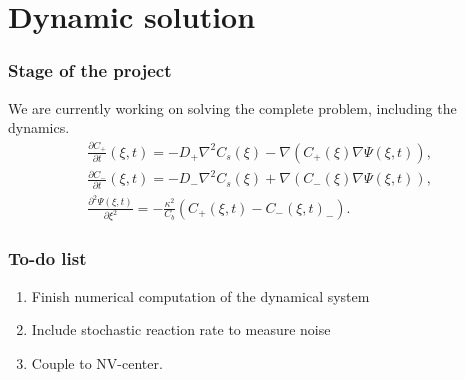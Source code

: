 \documentclass{beamer}
\begin{document}
\section{Dynamic solution}
\begin{frame}
\frametitle{Stage of the project}
We are currently working on solving the complete problem, including the dynamics. 
\begin{align}
\frac{\partial C_+}{\partial t}(\xi,t)  = - D_+ \nabla^2 C_s(\xi) - \nabla(C_+(\xi) \nabla \Psi(\xi,t)),\\
\frac{\partial C_-}{\partial t}(\xi,t) = - D_- \nabla^2 C_s(\xi) + \nabla(C_-(\xi) \nabla \Psi(\xi,t)),\\
\frac{\partial^2 \Psi(\xi,t)}{\partial \xi^2} = -\frac{\kappa^2}{C_b} \left(C_+(\xi,t) - C_-(\xi,t)_-\right).
\end{align}

\end{frame}

\begin{frame}
\frametitle{To-do list}
\begin{enumerate}
\item Finish numerical computation of the dynamical system
\item Include stochastic reaction rate to measure noise
\item Couple to NV-center. 
\end{enumerate}
\end{frame}
\end{document}
